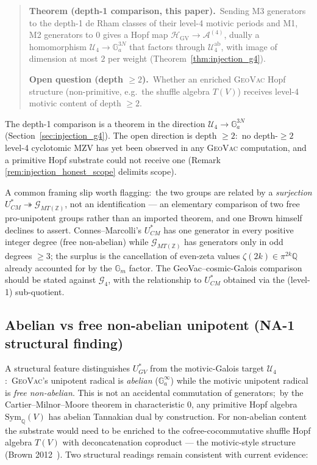 \documentclass[11pt,a4paper]{article}
\theoremstyle{plain}
\theoremstyle{definition}
\newcommand{\HGV}{\mathcal{H}_{\mathrm{GV}}}
\newcommand{\Sym}{\mathrm{Sym}}
\newcommand{\Ga}{\mathbb{G}_{a}}
\newcommand{\Gm}{\mathbb{G}_{m}}
\newcommand{\Q}{\mathbb{Q}}
\newcommand{\Z}{\mathbb{Z}}
\newcommand{\Ustar}{U^{*}}
\begin{document}
\begin{quote}
\textbf{Theorem (depth-1 comparison, this paper).}\ Sending M3 generators
to the depth-1 de Rham classes of their level-4 motivic periods and M1, M2
generators to $0$ gives a Hopf map $\HGV \to \mathcal{A}^{(4)}$, dually a
homomorphism $\mathcal{U}_4 \to \Ga^{3N}$ that factors through
$\mathcal{U}_4^{\mathrm{ab}}$, with image of dimension at most $2$ per
weight (Theorem~\ref{thm:injection_g4}).

\textbf{Open question (depth $\ge 2$).}\ Whether an enriched \textsc{GeoVac}
Hopf structure (non-primitive, e.g.\ the shuffle algebra $T(V)$) receives
level-4 motivic content of depth $\ge 2$.
\end{quote}

The depth-1 comparison is a theorem in the direction
$\mathcal{U}_{4} \to \Ga^{3N}$ (Section~\ref{sec:injection_g4}). The open
direction is depth $\ge 2$:\ no depth-$\ge 2$ level-4 cyclotomic MZV has
yet been observed in any \textsc{GeoVac} computation, and a primitive
Hopf substrate could not receive one (Remark
\ref{rem:injection_honest_scope} delimits scope).

A common framing slip worth flagging:\ the two groups are related by a
\emph{surjection} $\Ustar_{CM} \twoheadrightarrow \mathcal{G}_{MT(\Z)}$, not an
identification --- an elementary comparison of two free pro-unipotent
groups rather than an imported theorem, and one Brown himself declines to
assert. Connes--Marcolli's $\Ustar_{CM}$ has one generator
in every positive integer degree (free non-abelian) while
$\mathcal{G}_{MT(\Z)}$ has generators only in odd degrees $\ge 3$;
the surplus is the cancellation of even-zeta values $\zeta(2k) \in
\pi^{2k}\Q$ already accounted for by the $\Gm$ factor. The
GeoVac--cosmic-Galois comparison should be stated against
$\mathcal{G}_4$, with the relationship to $\Ustar_{CM}$ obtained via
the (level-1) sub-quotient.

\subsection{Abelian vs free non-abelian unipotent (NA-1 structural finding)}\label{sec:open_na1}

A structural feature distinguishes $\Ustar_{GV}$ from the
motivic-Galois target $\mathcal{U}_4$:\ \textsc{GeoVac}'s unipotent
radical is \emph{abelian} ($\Ga^{\infty}$) while the motivic
unipotent radical is \emph{free non-abelian}. This is not an
accidental commutation of generators;\ by the Cartier--Milnor--Moore
theorem in characteristic 0, any primitive Hopf algebra $\Sym_\Q(V)$
has abelian Tannakian dual by construction. For non-abelian content
the substrate would need to be enriched to the cofree-cocommutative
shuffle Hopf algebra $T(V)$ with deconcatenation coproduct --- the
motivic-style structure (Brown 2012~\cite{brown2012}). Two
structural readings remain consistent with current evidence:
\end{document}
